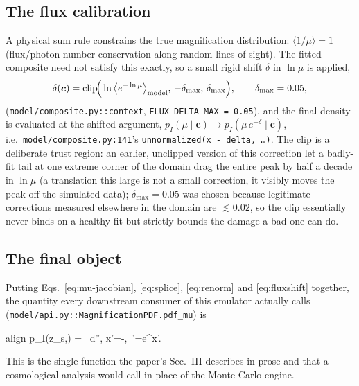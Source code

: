 \documentclass[11pt]{article}
\newcommand{\code}[1]{\texttt{#1}}
\newcommand{\file}[1]{\texttt{#1}}
\newcommand{\vect}[1]{\boldsymbol{#1}}
\begin{document}
\subsection{The flux calibration}

A physical sum rule constrains the true magnification distribution:
$\langle 1/\mu\rangle = 1$ (flux/photon-number conservation along random
lines of sight). The fitted composite need not satisfy this exactly, so a
small rigid shift $\delta$ in $\ln\mu$ is applied,
\begin{equation}
 \delta(\vect c) = \mathrm{clip}\!\Big(\ln\big\langle
 e^{-\ln\mu}\big\rangle_{\rm model},\, -\delta_{\max},\,\delta_{\max}\Big),
 \qquad \delta_{\max}=0.05,
 \label{eq:fluxshift}
\end{equation}
(\file{model/composite.py::context}, \code{FLUX\_DELTA\_MAX = 0.05}), and
the final density is evaluated at the shifted argument,
$p_I(\mu\mid\vect c) \to p_I(\mu\, e^{-\delta}\mid\vect c)$, i.e.\
\file{model/composite.py:141}'s \code{unnormalized(x - delta, \ldots)}. The
clip is a deliberate trust region: an earlier, unclipped version of this
correction let a badly-fit tail at one extreme corner of the domain drag
the entire peak by half a decade in $\ln\mu$ (a translation this large is
not a small correction, it visibly moves the peak off the simulated data);
$\delta_{\max}=0.05$ was chosen because legitimate corrections measured
elsewhere in the domain are $\lesssim 0.02$, so the clip essentially never
binds on a healthy fit but strictly bounds the damage a bad one can do.

\subsection{The final object}

Putting Eqs.~\ref{eq:mu-jacobian}, \ref{eq:splice}, \ref{eq:renorm} and
\ref{eq:fluxshift} together, the quantity every downstream consumer of this
emulator actually calls (\file{model/api.py::MagnificationPDF.pdf\_mu}) is
\begin{empheq}[box=\fbox]{align}
 p_I(\mu\mid z_s,\vect\Theta) \;=\; \cdot
 \frac{\big[1-w(x')\big]\,p_{\rm body}(\mu' \mid z_s,\vect\Theta) +
 w(x')\,p_{\rm tail}(\mu'\mid z_s,\vect\Theta)}
 {\displaystyle\int \big[\cdots\big]\, d\ln\mu''},\quad
 x'=\ln\mu-\delta,\ \mu'=e^{x'}.
\end{empheq}
This is the single function the paper's Sec.~III describes in prose and
that a cosmological analysis would call in place of the Monte Carlo engine.
\end{document}
